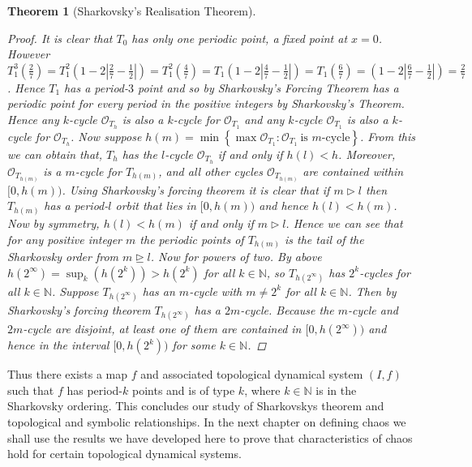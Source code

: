 \documentclass[11pt,a4paper,oneside]{memoir}
\theoremstyle{plain}
\newtheorem{thm}{Theorem}[chapter]
\theoremstyle{definition}
\begin{document}
\begin{thm}[Sharkovsky's Realisation Theorem]
\begin{proof}
        It is clear that $T_0$ has only one periodic point, a fixed point at $x = 0$. However $T_1^3\left(\frac{2}{7}\right) = T_1^2\left(1-2\left\lvert\frac{2}{7} - \frac{1}{2}\right\rvert\right) = T_1^2\left(\frac{4}{7}\right) = T_1\left(1-2\left\lvert\frac{4}{7} - \frac{1}{2}\right\rvert\right) = T_1\left(\frac{6}{7}\right) = \left(1-2\left\lvert\frac{6}{7} - \frac{1}{2}\right\rvert\right) = \frac{2}{7}$. Hence $T_1$ has a period-$3$ point and so by Sharkovsky's Forcing Theorem has a periodic point for every period in the positive integers by Sharkovsky's Theorem. Hence any $k$-cycle $\mathcal{O}_{T_h}$ is also a $k$-cycle for $\mathcal O_{T_1}$ and any $k$-cycle $\mathcal{O}_{T_1}$ is also a $k$-cycle for $\mathcal{O}_{T_h}$. Now suppose $h(m) = \min \left\lbrace \max \mathcal{O}_{T_1} : \mathcal{O}_{T_1} \ \text{is $m$-cycle} \right\rbrace$. From this we can obtain that, $T_h$ has the $l$-cycle $\mathcal{O}_{T_h}$ if and only if $h(l) < h$. Moreover, $\mathcal{O}_{T_{h(m)}}$ is a $m$-cycle for $T_{h(m)}$, and all other cycles $\mathcal{O}_{T_{h(m)}}$ are contained within $[0, h(m))$. Using Sharkovsky's forcing theorem it is clear that if $m \rhd l$ then $T_{h(m)}$ has a period-$l$ orbit that lies in $[0, h(m))$ and hence $h(l) < h(m)$. Now by symmetry, $h(l) < h(m)$ if and only if $m \rhd l$. Hence we can see that for any positive integer $m$ the periodic points of $T_{h(m)}$ is the tail of the Sharkovsky order from $m \unrhd l$. Now for powers of two. By above $h(2^\infty) = \sup_k(h(2^k)) > h(2^k)$ for all $k \in \mathbb{N}$, so $T_{h(2^\infty)}$ has $2^k$-cycles for all $k \in \mathbb{N}$. Suppose $T_{h(2^\infty)}$ has an $m$-cycle with $m \neq 2^k$ for all $k \in \mathbb{N}$. Then by Sharkovsky's forcing theorem $T_{h(2^\infty)}$ has a $2m$-cycle. Because the $m$-cycle and $2m$-cycle are disjoint, at least one of them are contained in $[0, h(2^\infty))$ and hence in the interval $[0, h(2^k))$ for some $k \in \mathbb{N}$.
    \end{proof}
\end{thm}

Thus there exists a map $f$ and associated topological dynamical system $(I, f)$ such that $f$ has period-$k$ points and is of type $k$, where $k \in \mathbb{N}$ is in the Sharkovsky ordering. This concludes our study of Sharkovskys theorem and topological and symbolic relationships. In the next chapter on defining chaos we shall use the results we have developed here to prove that characteristics of chaos hold for certain topological dynamical systems.
\end{document}
